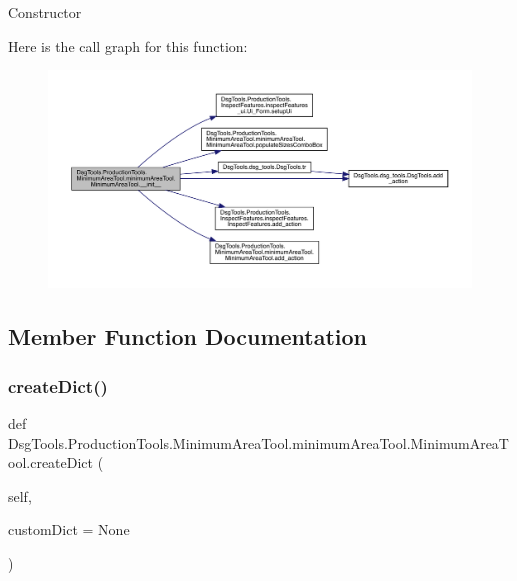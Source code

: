 \begin{DoxyVerb}Constructor
\end{DoxyVerb}
 Here is the call graph for this function\+:
\nopagebreak
\begin{figure}[H]
\begin{center}
\leavevmode
\includegraphics[width=350pt]{class_dsg_tools_1_1_production_tools_1_1_minimum_area_tool_1_1minimum_area_tool_1_1_minimum_area_tool_a9a433c8f31d9d3eef80462dda2dba5b2_cgraph}
\end{center}
\end{figure}


\subsection{Member Function Documentation}
\mbox{\label{class_dsg_tools_1_1_production_tools_1_1_minimum_area_tool_1_1minimum_area_tool_1_1_minimum_area_tool_a15618d07c2bcdd70e2d9aaa3f6340eae}} 
\subsubsection{\texorpdfstring{create\+Dict()}{createDict()}}
{\footnotesize\ttfamily def Dsg\+Tools.\+Production\+Tools.\+Minimum\+Area\+Tool.\+minimum\+Area\+Tool.\+Minimum\+Area\+Tool.\+create\+Dict (\begin{DoxyParamCaption}\item[{}]{self,  }\item[{}]{custom\+Dict = {\ttfamily None} }\end{DoxyParamCaption})}

